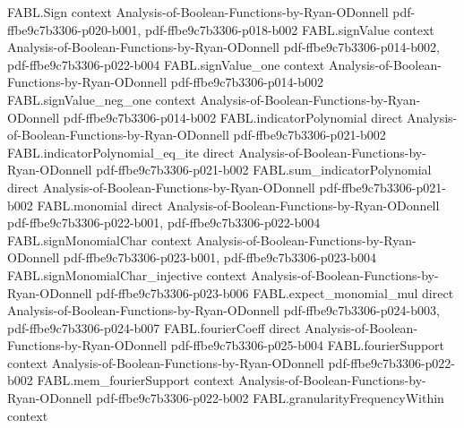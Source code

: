 \begin{theorem}
\label{FABL.totalInfluence_eq_sum_fourierCoeff_singleton_of_monotone}
\leanok
{}
\proofstep
  {FABL.Sign}
  {context}
  {Analysis-of-Boolean-Functions-by-Ryan-ODonnell}
  {pdf-ffbe9c7b3306-p020-b001,
    pdf-ffbe9c7b3306-p018-b002}
\proofstep
  {FABL.signValue}
  {context}
  {Analysis-of-Boolean-Functions-by-Ryan-ODonnell}
  {pdf-ffbe9c7b3306-p014-b002,
    pdf-ffbe9c7b3306-p022-b004}
\proofstep
  {FABL.signValue_one}
  {context}
  {Analysis-of-Boolean-Functions-by-Ryan-ODonnell}
  {pdf-ffbe9c7b3306-p014-b002}
\proofstep
  {FABL.signValue_neg_one}
  {context}
  {Analysis-of-Boolean-Functions-by-Ryan-ODonnell}
  {pdf-ffbe9c7b3306-p014-b002}
\proofstep
  {FABL.indicatorPolynomial}
  {direct}
  {Analysis-of-Boolean-Functions-by-Ryan-ODonnell}
  {pdf-ffbe9c7b3306-p021-b002}
\proofstep
  {FABL.indicatorPolynomial_eq_ite}
  {direct}
  {Analysis-of-Boolean-Functions-by-Ryan-ODonnell}
  {pdf-ffbe9c7b3306-p021-b002}
\proofstep
  {FABL.sum_indicatorPolynomial}
  {direct}
  {Analysis-of-Boolean-Functions-by-Ryan-ODonnell}
  {pdf-ffbe9c7b3306-p021-b002}
\proofstep
  {FABL.monomial}
  {direct}
  {Analysis-of-Boolean-Functions-by-Ryan-ODonnell}
  {pdf-ffbe9c7b3306-p022-b001,
    pdf-ffbe9c7b3306-p022-b004}
\proofstep
  {FABL.signMonomialChar}
  {context}
  {Analysis-of-Boolean-Functions-by-Ryan-ODonnell}
  {pdf-ffbe9c7b3306-p023-b001,
    pdf-ffbe9c7b3306-p023-b004}
\proofstep
  {FABL.signMonomialChar_injective}
  {context}
  {Analysis-of-Boolean-Functions-by-Ryan-ODonnell}
  {pdf-ffbe9c7b3306-p023-b006}
\proofstep
  {FABL.expect_monomial_mul}
  {direct}
  {Analysis-of-Boolean-Functions-by-Ryan-ODonnell}
  {pdf-ffbe9c7b3306-p024-b003,
    pdf-ffbe9c7b3306-p024-b007}
\proofstep
  {FABL.fourierCoeff}
  {direct}
  {Analysis-of-Boolean-Functions-by-Ryan-ODonnell}
  {pdf-ffbe9c7b3306-p025-b004}
\proofstep
  {FABL.fourierSupport}
  {context}
  {Analysis-of-Boolean-Functions-by-Ryan-ODonnell}
  {pdf-ffbe9c7b3306-p022-b002}
\proofstep
  {FABL.mem_fourierSupport}
  {context}
  {Analysis-of-Boolean-Functions-by-Ryan-ODonnell}
  {pdf-ffbe9c7b3306-p022-b002}
\proofstep
  {FABL.granularityFrequencyWithin}
  {context}

\end{theorem}
